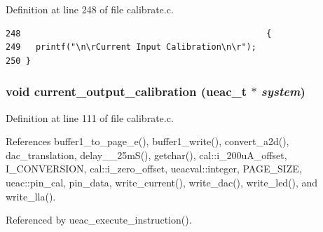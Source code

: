 Definition at line 248 of file calibrate.c.

\footnotesize\begin{verbatim}248                                                 {
249   printf("\n\rCurrent Input Calibration\n\r");
250 }
\end{verbatim}\normalsize 


\subsubsection{\setlength{\rightskip}{0pt plus 5cm}void current\_\-output\_\-calibration ({\bf ueac\_\-t} $\ast$ {\em system})}\label{calibrate_8c_a3}




Definition at line 111 of file calibrate.c.

References buffer1\_\-to\_\-page\_\-e(), buffer1\_\-write(), convert\_\-a2d(), dac\_\-translation, delay\_\_\-25m\-S(), getchar(), cal::i\_\-200u\-A\_\-offset, I\_\-CONVERSION, cal::i\_\-zero\_\-offset, ueacval::integer, PAGE\_\-SIZE, ueac::pin\_\-cal, pin\_\-data, write\_\-current(), write\_\-dac(), write\_\-led(), and write\_\-lla().

Referenced by ueac\_\-execute\_\-instruction().

